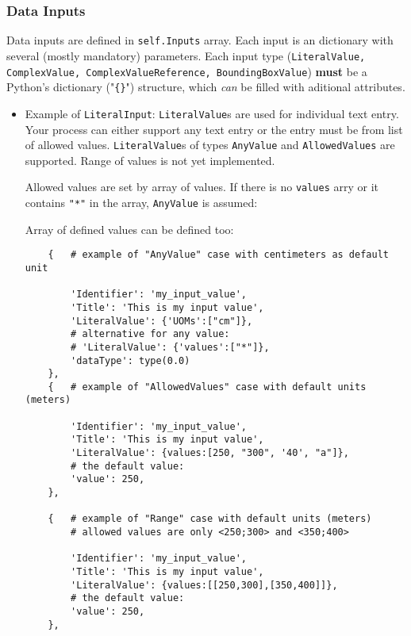 \documentclass[a4paper,11pt]{article}
\begin{document}
    \subsubsection{Data Inputs}
     
    Data inputs are defined in \texttt{self.Inputs} array. Each input is an dictionary with
    several (mostly mandatory) parameters. Each input type
    (\texttt{LiteralValue, ComplexValue, ComplexValueReference,
    BoundingBoxValue}) \textbf{must} be a Python's dictionary
    ("\texttt{\{\}}") structure, which \emph{can} be filled with aditional
    attributes.


    \begin{itemize}
        \item Example of \texttt{LiteralInput}:
        \texttt{LiteralValue}s are used for individual text entry. Your
        process can either support any text entry or the entry must be from
        list of allowed values. \texttt{LiteralValue}s of types \texttt{AnyValue} and
        \texttt{AllowedValues} are supported. Range of values is not yet
        implemented. 

        Allowed values are set by array of values. If there is no
        \texttt{values} arry or it contains \texttt{"*"}
        in the array, \texttt{AnyValue} is assumed:

        Array of defined values can be defined too:

    \begin{verbatim}
    {   # example of "AnyValue" case with centimeters as default unit

        'Identifier': 'my_input_value',
        'Title': 'This is my input value',
        'LiteralValue': {'UOMs':["cm"]},
        # alternative for any value:
        # 'LiteralValue': {'values':["*"]},
        'dataType': type(0.0)
    },
    {   # example of "AllowedValues" case with default units (meters)

        'Identifier': 'my_input_value',
        'Title': 'This is my input value',
        'LiteralValue': {values:[250, "300", '40', "a"]},
        # the default value:
        'value': 250,
    },

    {   # example of "Range" case with default units (meters)
        # allowed values are only <250;300> and <350;400>

        'Identifier': 'my_input_value',
        'Title': 'This is my input value',
        'LiteralValue': {values:[[250,300],[350,400]]},
        # the default value:
        'value': 250,
    },


\end{verbatim}
\end{itemize}
\end{document}
